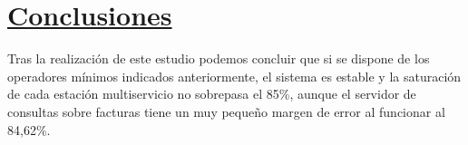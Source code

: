 \section{\textbf{\underline{Conclusiones}}}
Tras la realización de este estudio podemos concluir que si se dispone de los operadores mínimos indicados anteriormente, el sistema es estable y la saturación de cada estación multiservicio no sobrepasa el 85\%, aunque el servidor de consultas sobre facturas tiene un muy pequeño margen de error al funcionar al 84,62\%. 
